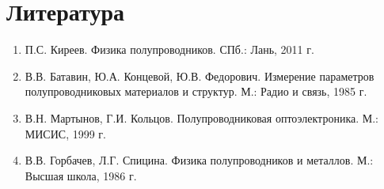 \section{Литература}
\begin{enumerate}
\item П.С. Киреев. Физика полупроводников. СПб.: Лань, 2011 г.
\item В.В. Батавин, Ю.А. Концевой, Ю.В. Федорович. Измерение параметров полупроводниковых материалов и структур. М.: Радио и связь, 1985 г.
\item В.Н. Мартынов, Г.И. Кольцов. Полупроводниковая оптоэлектроника. М.: МИСИС, 1999 г.
\item В.В. Горбачев, Л.Г. Спицина. Физика полупроводников и металлов. М.: Высшая школа, 1986 г.
\end{enumerate}
